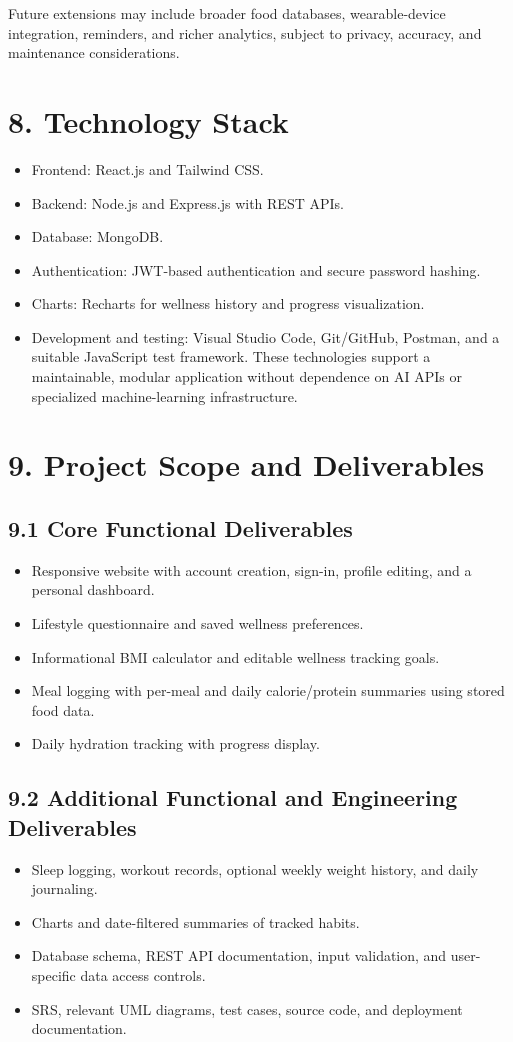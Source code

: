 \documentclass[11pt,a4paper]{article}
\begin{document}
Future extensions may include broader food databases, wearable-device integration, reminders, and richer analytics, subject to privacy, accuracy, and maintenance considerations.

\section*{8. Technology Stack}
\begin{itemize}
\item Frontend: React.js and Tailwind CSS.
\item Backend: Node.js and Express.js with REST APIs.
\item Database: MongoDB.
\item Authentication: JWT-based authentication and secure password hashing.
\item Charts: Recharts for wellness history and progress visualization.
\item Development and testing: Visual Studio Code, Git/GitHub, Postman, and a suitable JavaScript test framework. These technologies support a maintainable, modular application without dependence on AI APIs or specialized machine-learning infrastructure.
\end{itemize}
\section*{9. Project Scope and Deliverables}
\subsection*{9.1 Core Functional Deliverables}
\begin{itemize}
\item Responsive website with account creation, sign-in, profile editing, and a personal dashboard.
\item Lifestyle questionnaire and saved wellness preferences.
\item Informational BMI calculator and editable wellness tracking goals.
\item Meal logging with per-meal and daily calorie/protein summaries using stored food data.
\item Daily hydration tracking with progress display.
\end{itemize}
\subsection*{9.2 Additional Functional and Engineering Deliverables}
\begin{itemize}
\item Sleep logging, workout records, optional weekly weight history, and daily journaling.
\item Charts and date-filtered summaries of tracked habits.
\item Database schema, REST API documentation, input validation, and user-specific data access controls.
\item SRS, relevant UML diagrams, test cases, source code, and deployment documentation.
\end{itemize}
\end{document}
